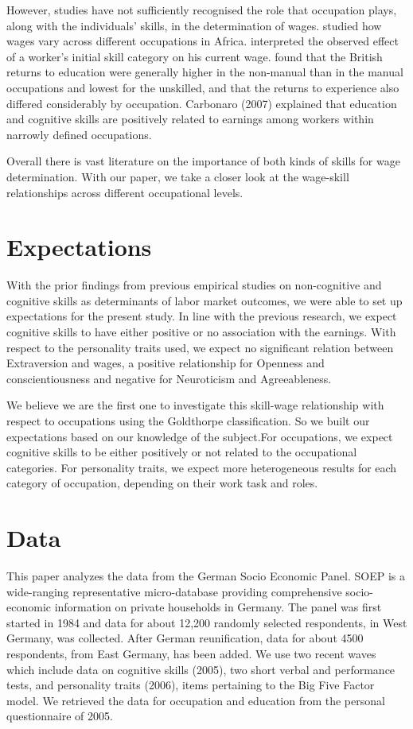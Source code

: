 \documentclass[11pt, a4paper, leqno]{article}
\begin{document}
However, studies have not sufficiently recognised the role that occupation plays, along with the individuals' skills, in the determination of wages. \citet{Knight} studied how wages vary across different occupations in Africa. \citet{Birnbaum} interpreted the observed effect of a worker's initial skill category on his current wage. \citet{Stewart} found that the British returns to education were generally higher in the non-manual than in the manual occupations and lowest for the unskilled, and that the returns to experience also differed considerably by occupation. Carbonaro (2007) explained that education and cognitive skills are positively related to earnings among workers within narrowly defined occupations.

Overall there is vast literature on the importance of both kinds of skills for wage determination. With our paper, we take a closer look at the wage-skill relationships across different occupational levels.


\section*{Expectations}

With the prior findings from previous empirical studies on non-cognitive and cognitive skills as determinants of labor market outcomes, we were able to set up expectations for the present study. 
In line with the previous research, we expect cognitive skills to have either positive or no association with the earnings. With respect to the personality traits used, we expect no significant relation between Extraversion and wages, a positive relationship for Openness and conscientiousness and negative for Neuroticism and Agreeableness.\par

We believe we are the first one to investigate this skill-wage relationship with respect to occupations using the Goldthorpe classification. So we built our expectations based on our knowledge of the subject.For occupations, we expect cognitive skills to be either positively or not related to the occupational categories. For personality traits, we expect more heterogeneous results for each category of occupation, depending on their work task and roles.


\section*{Data}

This paper analyzes the data from the German Socio Economic Panel. SOEP is a wide-ranging representative micro-database providing comprehensive socio-economic information on private households in Germany. The panel was first started in 1984 and data for about 12,200 randomly selected respondents, in West Germany, was collected. After German reunification, data for about 4500 respondents, from East Germany, has been added. We use two recent waves which include data on cognitive skills (2005), two short verbal and performance tests, and personality traits (2006), items pertaining to the Big Five Factor model. We retrieved the data for occupation and education from the personal questionnaire of 2005. 
\end{document}
